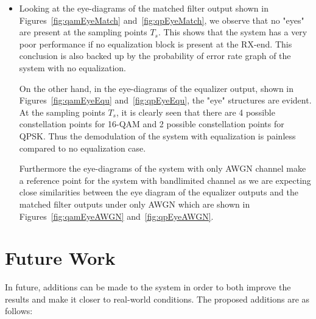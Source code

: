 \documentclass[]{article}
\begin{document}
\begin{itemize}
\item Looking at the eye-diagrams of the matched filter output shown in Figures~\ref{fig:qamEyeMatch} and~\ref{fig:qpEyeMatch}, we observe that no "eyes" are present at the sampling points $T_s$. This shows that the system has a very poor performance if no equalization block is present at the RX-end. This conclusion is also backed up by the probability of error rate graph of the system with no equalization. 

On the other hand, in the eye-diagrams of the equalizer output, shown in Figures~\ref{fig:qamEyeEqu} and~\ref{fig:qpEyeEqu}, the "eye" structures are evident. At the sampling points $T_s$, it is clearly seen that there are 4 possible constellation points for 16-QAM and 2 possible constellation points for QPSK. Thus the demodulation of the system with equalization is painless compared to no equalization case.  

Furthermore the eye-diagrams of the system with only AWGN channel make a reference point for the system with bandlimited channel as we are expecting close similarities between the eye diagram of the equalizer outputs and the matched filter outputs under only AWGN which are shown in Figures~\ref{fig:qamEyeAWGN} and~\ref{fig:qpEyeAWGN}. 




\end{itemize}



\section{Future Work}

In future, additions can be made to the system in order to both improve  the results and make it closer to real-world conditions. The proposed additions are as follows:
\end{document}

